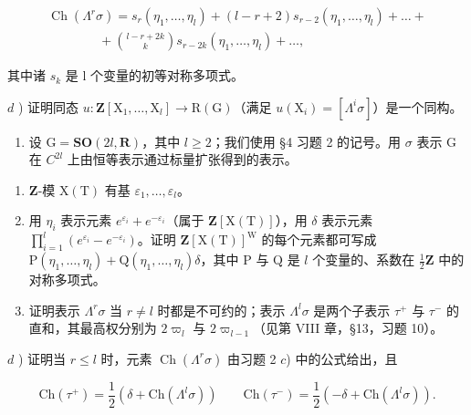 \begin{enumerate}
\[
\begin{array}{c} \operatorname{Ch} (\Lambda^ {r}   \sigma) = s _ {r} (\eta_ {1}, \ldots , \eta_ {l}) + (l - r + 2) s _ {r - 2} (\eta_ {1}, \ldots , \eta_ {l}) + \dots + \\ \qquad \qquad + \binom {l - r + 2 k} {k} s _ {r - 2 k} (\eta_ {1}, \ldots , \eta_ {l}) + \dots , \end{array}
\]

其中诸 \(s_{k}\) 是 l 个变量的初等对称多项式。

\(d\) ) 证明同态 \(u:\mathbf{Z}[\mathrm{X}_1,\dots ,\mathrm{X}_l]\to \mathrm{R}(\mathrm{G})\)（满足 \(u(\mathrm{X}_i) = [\Lambda^i\sigma ]\)）是一个同构。

\begin{enumerate}
\def\labelenumi{\arabic{enumi})}
\setcounter{enumi}{2}
\tightlist
\item
  设 \(\mathrm{G} = \mathbf{SO}(2l, \mathbf{R})\)，其中 \(l \geq 2\)；我们使用 §4 习题 2 的记号。用 \(\sigma\) 表示 G 在 \(C^{2l}\) 上由恒等表示通过标量扩张得到的表示。
\end{enumerate}

\begin{enumerate}
\def\labelenumi{\alph{enumi})}
\item
  \(\mathbf{Z}\)-模 \(\mathrm{X(T)}\) 有基 \(\varepsilon_1, \ldots, \varepsilon_l\)。
\item
  用 \(\eta_i\) 表示元素 \(e^{\varepsilon_i} + e^{-\varepsilon_i}\)（属于 \(\mathbf{Z}[\mathrm{X(T)}]\)），用 \(\delta\) 表示元素 \(\prod_{i=1}^{l}(e^{\varepsilon_i} - e^{-\varepsilon_i})\)。证明 \(\mathbf{Z}[\mathrm{X(T)}]^{\mathrm{W}}\) 的每个元素都可写成 \(\mathrm{P}(\eta_1, \ldots, \eta_l) + \mathrm{Q}(\eta_1, \ldots, \eta_l)\delta\)，其中 \(\mathrm{P}\) 与 \(\mathrm{Q}\) 是 \(l\) 个变量的、系数在 \(\frac{1}{2}\mathbf{Z}\) 中的对称多项式。
\item
  证明表示 \(\Lambda^{r}\sigma\) 当 \(r\neq l\) 时都是不可约的；表示 \(\Lambda^{l}\sigma\) 是两个子表示 \(\tau^{+}\) 与 \(\tau^{-}\) 的直和，其最高权分别为 \(2\varpi_{l}\) 与 \(2\varpi_{l-1}\)（见第 VIII 章，§13，习题 10）。
\end{enumerate}

\(d\) ) 证明当 \(r \leq l\) 时，元素 \(\operatorname{Ch}(\Lambda^r \sigma)\) 由习题 2 \(c\)) 中的公式给出，且

\[
\mathrm{Ch} (\tau^ {+}) = \frac {1}{2} (\delta + \mathrm{Ch} (\Lambda ^ {l} \sigma)) \qquad \mathrm{Ch} (\tau^ {-}) = \frac {1}{2} (- \delta + \mathrm{Ch} (\Lambda ^ {l} \sigma)).
\]


\end{enumerate}
